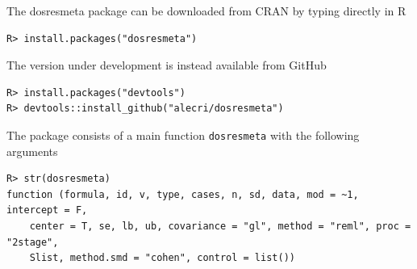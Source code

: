 \documentclass[11pt,a4paper,twoside,openany]{book}\usepackage{knitr}
\newcommand{\pkg}[1]{{\fontseries{b}\selectfont #1}}
\begin{document}
{The \pkg{dosresmeta} package can be downloaded from CRAN by typing directly in \textsf{R} 
\begin{knitrout}\footnotesize
{}\color{fgcolor}\begin{kframe}
\begin{verbatim}
R> install.packages("dosresmeta")
\end{verbatim}
\end{kframe}
\end{knitrout}
The version under development is instead available from GitHub
\begin{knitrout}\footnotesize
{}\color{fgcolor}\begin{kframe}
\begin{verbatim}
R> install.packages("devtools")
R> devtools::install_github("alecri/dosresmeta")
\end{verbatim}
\end{kframe}
\end{knitrout}

\noindent The package consists of a main function \texttt{dosresmeta} with the following arguments
\begin{knitrout}\footnotesize
{}\color{fgcolor}\begin{kframe}
\begin{verbatim}
R> str(dosresmeta)
function (formula, id, v, type, cases, n, sd, data, mod = ~1, intercept = F, 
    center = T, se, lb, ub, covariance = "gl", method = "reml", proc = "2stage", 
    Slist, method.smd = "cohen", control = list())  
\end{verbatim}
\end{kframe}
\end{knitrout}

}
\end{document}
